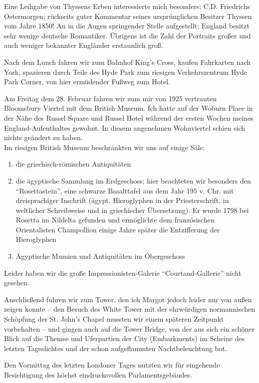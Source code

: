 \documentclass[a5paper,pagesize,10pt,twoside=true]{scrbook}
\begin{document}
Eine Leihgabe von Thyssens Erben interessierte mich besonders: C.D. Friedrichs Ostermorgen; rückseits guter Kommentar seines ursprünglichen Besitzer Thyssen vom Jahre 1850! An in die Augen springender Stelle aufgestellt; England besitzt sehr wenige deutsche Romantiker. Übrigens ist die Zahl der Portraits großer und auch weniger bekannter Engländer erstaunlich groß.

Nach dem Lunch fahren wir zum Bahnhof King's Cross, kaufen Fahrkarten nach York, spazieren durch Teile des Hyde Park zum riesigen Verkehrszentrum Hyde Park Corner, von hier ermüdender Fußweg zum Hotel.

Am Freitag dem 28. Februar fahren wir zum mir von 1925 vertrauten Bloomsbury Viertel mit dem British Museum. Ich hatte auf der Woburn Place in der Nähe des Russel Square und Russel Hotel während der ersten Wochen meines England-Aufenthaltes gewohnt. In diesem angenehmen Wohnviertel schien sich nichts geändert zu haben.\\

Im riesigen British Museum beschränkten wir uns auf einige Säle:
\begin{enumerate}
	\item die griechisch-römischen Antiquitäten 
	\item die ägyptische Sammlung im Erdgeschoss; hier beachteten wir besonders den \enquote{Rosettastein}, eine schwarze Basalttafel aus dem Jahr 195 v. Chr. mit dreisprachiger Inschrift (ägypt. Hieroglyphen in der Priesterschrift, in weltlicher Schreibweise und in griechischer Übersetzung). Er wurde 1798 bei Rosetta im Nildelta gefunden und ermöglichte dem französischen Orientalisten Champollion einige Jahre später die Entzifferung der Hieroglyphen
	\item Ägyptische Mumien und Antiquitäten im Obergeschoss
\end{enumerate}

Leider haben wir die große Impressionisten-Galerie \enquote{Courtand-Gallerie} nicht gesehen.

Anschließend fuhren wir zum Tower, den ich Margot jedoch leider nur von außen zeigen konnte -- den Besuch des White Tower mit der ehrwürdigen normannischen Schöpfung der St. John's Chapel mussten wir einem späteren Zeitpunkt vorbehalten -- und gingen auch auf die Tower Bridge, von der aus sich ein schöner Blick auf die Themse und Uferpartien der City (Embarkments) im Scheine des letzten Tageslichtes und der schon aufgeflammten Nachtbeleuchtung bot.

Den Vormittag des letzten Londoner Tages nutzten wir für eingehende Besichtigung des höchst eindrucksvollen Parlamentsgebäudes.
\end{document}
